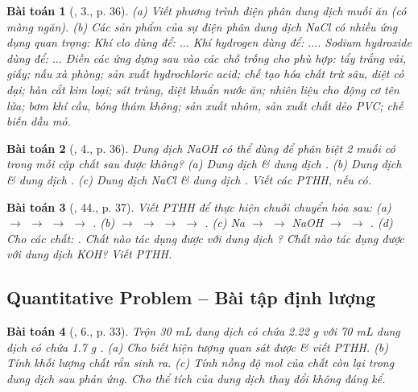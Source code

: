 \documentclass{article}
\newtheorem{baitoan}{Bài toán}
\begin{document}
\begin{baitoan}[\cite{SGK_Hoa_Hoc_9}, 3., p. 36]
	(a) Viết phương trình điện phân dung dịch muối ăn (có màng ngăn). (b) Các sản phẩm của sự điện phân dung dịch \emph{NaCl} có nhiều ứng dụng quan trọng: Khí clo dùng để: $\ldots$ Khí hydrogen dùng để: $\ldots$. Sodium hydroxide dùng để: $\ldots$ Điền các ứng dựng sau vào các chỗ trống cho phù hợp: tẩy trắng vải, giấy; nấu xà phòng; sản xuất hydrochloric acid; chế tạo hóa chất trừ sâu, diệt cỏ dại; hàn cắt kim loại; sát trùng, diệt khuẩn nước ăn; nhiên liệu cho động cơ tên lửa; bơm khí cầu, bóng thám không; sản xuất nhôm, sản xuất chất dẻo PVC; chế biến dầu mỏ.
\end{baitoan}

\begin{baitoan}[\cite{SGK_Hoa_Hoc_9}, 4., p. 36]
	Dung dịch \emph{NaOH} có thể dùng để phân biệt 2 muối có trong mỗi cặp chất sau được không? (a) Dung dịch \emph{} \& dung dịch \emph{}. (b) Dung dịch \emph{} \& dung dịch \emph{}. (c) Dung dịch \emph{NaCl} \& dung dịch \emph{}. Viết các PTHH, nếu có.
\end{baitoan}

\begin{baitoan}[\cite{An_350_BT_Hoa_Hoc_9}, 44., p. 37]
	Viết PTHH để thực hiện chuỗi chuyển hóa sau: (a) \emph{ $\to$  $\to$  $\to$  $\to$ }. (b) \emph{ $\to$  $\to$  $\to$  $\to$ }. (c) \emph{Na $\to$  $\to$ NaOH $\to$  $\to$ }. (d) Cho các chất: \emph{}. Chất nào tác dụng được với dung dịch \emph{}? Chất nào tác dụng được với dung dịch \emph{KOH}? Viết PTHH.
\end{baitoan}

\subsection{Quantitative Problem -- Bài tập định lượng}

\begin{baitoan}[\cite{SGK_Hoa_Hoc_9}, 6., p. 33]
	Trộn \emph{30 mL} dung dịch có chứa \emph{2.22 g } với \emph{70 mL} dung dịch có chứa \emph{1.7 g }. (a) Cho biết hiện tượng quan sát được \& viết PTHH. (b) Tính khối lượng chất rắn sinh ra. (c) Tính nồng độ mol của chất còn lại trong dung dịch sau phản ứng. Cho thể tích của dung dịch thay đổi không đáng kể.
\end{baitoan}
\end{document}
